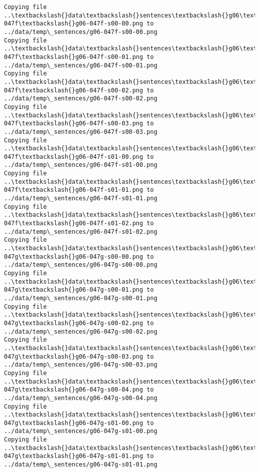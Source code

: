 \documentclass[11pt]{article}
\begin{document}
\begin{Verbatim}[commandchars=\\\{\}]
Copying file ..\textbackslash{}data\textbackslash{}sentences\textbackslash{}g06\textbackslash{}g06-047f\textbackslash{}g06-047f-s00-00.png to
../data/temp\_sentences/g06-047f-s00-00.png
Copying file ..\textbackslash{}data\textbackslash{}sentences\textbackslash{}g06\textbackslash{}g06-047f\textbackslash{}g06-047f-s00-01.png to
../data/temp\_sentences/g06-047f-s00-01.png
Copying file ..\textbackslash{}data\textbackslash{}sentences\textbackslash{}g06\textbackslash{}g06-047f\textbackslash{}g06-047f-s00-02.png to
../data/temp\_sentences/g06-047f-s00-02.png
Copying file ..\textbackslash{}data\textbackslash{}sentences\textbackslash{}g06\textbackslash{}g06-047f\textbackslash{}g06-047f-s00-03.png to
../data/temp\_sentences/g06-047f-s00-03.png
Copying file ..\textbackslash{}data\textbackslash{}sentences\textbackslash{}g06\textbackslash{}g06-047f\textbackslash{}g06-047f-s01-00.png to
../data/temp\_sentences/g06-047f-s01-00.png
Copying file ..\textbackslash{}data\textbackslash{}sentences\textbackslash{}g06\textbackslash{}g06-047f\textbackslash{}g06-047f-s01-01.png to
../data/temp\_sentences/g06-047f-s01-01.png
Copying file ..\textbackslash{}data\textbackslash{}sentences\textbackslash{}g06\textbackslash{}g06-047f\textbackslash{}g06-047f-s01-02.png to
../data/temp\_sentences/g06-047f-s01-02.png
Copying file ..\textbackslash{}data\textbackslash{}sentences\textbackslash{}g06\textbackslash{}g06-047g\textbackslash{}g06-047g-s00-00.png to
../data/temp\_sentences/g06-047g-s00-00.png
Copying file ..\textbackslash{}data\textbackslash{}sentences\textbackslash{}g06\textbackslash{}g06-047g\textbackslash{}g06-047g-s00-01.png to
../data/temp\_sentences/g06-047g-s00-01.png
Copying file ..\textbackslash{}data\textbackslash{}sentences\textbackslash{}g06\textbackslash{}g06-047g\textbackslash{}g06-047g-s00-02.png to
../data/temp\_sentences/g06-047g-s00-02.png
Copying file ..\textbackslash{}data\textbackslash{}sentences\textbackslash{}g06\textbackslash{}g06-047g\textbackslash{}g06-047g-s00-03.png to
../data/temp\_sentences/g06-047g-s00-03.png
Copying file ..\textbackslash{}data\textbackslash{}sentences\textbackslash{}g06\textbackslash{}g06-047g\textbackslash{}g06-047g-s00-04.png to
../data/temp\_sentences/g06-047g-s00-04.png
Copying file ..\textbackslash{}data\textbackslash{}sentences\textbackslash{}g06\textbackslash{}g06-047g\textbackslash{}g06-047g-s01-00.png to
../data/temp\_sentences/g06-047g-s01-00.png
Copying file ..\textbackslash{}data\textbackslash{}sentences\textbackslash{}g06\textbackslash{}g06-047g\textbackslash{}g06-047g-s01-01.png to
../data/temp\_sentences/g06-047g-s01-01.png

\end{Verbatim}
\end{document}
